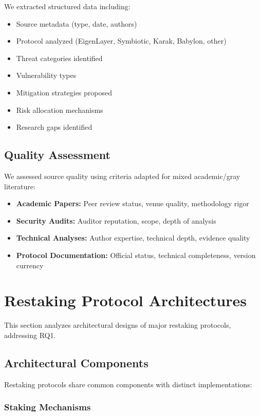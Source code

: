 \documentclass[runningheads]{llncs}
\begin{document}
We extracted structured data including:
\begin{itemize}
    \item Source metadata (type, date, authors)
    \item Protocol analyzed (EigenLayer, Symbiotic, Karak, Babylon, other)
    \item Threat categories identified
    \item Vulnerability types
    \item Mitigation strategies proposed
    \item Risk allocation mechanisms
    \item Research gaps identified
\end{itemize}

\subsection{Quality Assessment}

We assessed source quality using criteria adapted for mixed academic/gray literature:
\begin{itemize}
    \item \textbf{Academic Papers:} Peer review status, venue quality, methodology rigor
    \item \textbf{Security Audits:} Auditor reputation, scope, depth of analysis
    \item \textbf{Technical Analyses:} Author expertise, technical depth, evidence quality
    \item \textbf{Protocol Documentation:} Official status, technical completeness, version currency
\end{itemize}

\vspace{-0.3cm}
\section{Restaking Protocol Architectures}
\label{sec:architecture}

This section analyzes architectural designs of major restaking protocols, addressing RQ1.

\subsection{Architectural Components}

Restaking protocols share common components with distinct implementations:

\subsubsection{Staking Mechanisms}
\end{document}
